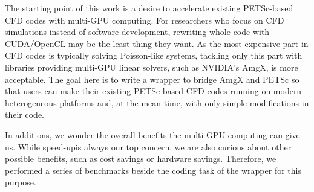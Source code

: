 The starting point of this work is a desire to 
accelerate existing PETSc\cite{petsc-web-page}-based CFD codes with multi-GPU computing.
For researchers who focus on CFD simulations 
instead of software development,
rewriting whole code with CUDA/OpenCL may be the least thing they want.
As the most expensive part in CFD codes is typically solving Poisson-like systems,
tackling only this part with libraries providing multi-GPU linear solvers, 
such as NVIDIA's AmgX\cite{amgx-web-page},
is more acceptable.
The goal here is to write a wrapper to bridge AmgX and PETSc 
so that users can make their existing PETSc-based CFD codes running on modern heterogeneous platforms
and, at the mean time, with only simple modifications in their code.

In additions, we wonder the overall benefits the multi-GPU computing can give us.
While speed-up\footnotemark is always our top concern,
we are also curious about other possible benefits, such as cost savings or hardware savings.
Therefore, we performed a series of benchmarks beside the coding task of the wrapper for this purpose.

